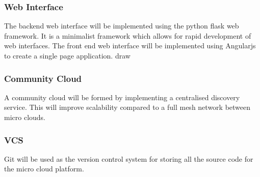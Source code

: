 \documentclass{sig-alternate-05-2015}
\begin{document}
\subsubsection{Web Interface}
The backend web interface will be implemented using the python flask web framework. It is a minimalist framework which allows for rapid development of web interfaces. 
The front end web interface will be implemented using Angularjs to create a single page application. 
draw
\subsubsection{Community Cloud}
A community cloud will be formed by implementing a centralised discovery service. This will improve scalability compared to a full mesh network between micro clouds.

\subsubsection{VCS}
Git will be used as the version control system for storing all the source code for the micro cloud platform.



 
\end{document}
